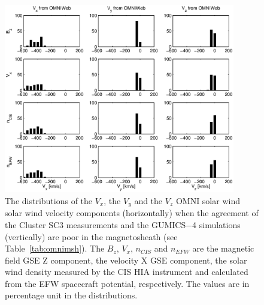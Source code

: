 \documentclass[linenumbers,draft]{agujournal}
\begin{document}
\begin{figure}[h]
\centering
\includegraphics[width=0.9\textwidth,angle=0]{swe-2020-corr-f18.eps}  
\caption{The distributions of the $V_{x}$, the $V_{y}$ and the $V_{z}$ OMNI solar wind solar wind velocity components (horizontally) when the agreement of the Cluster SC3 measurements and the GUMICS$-$4 simulations (vertically) are poor in the magnetosheath (see Table~\ref{tab:omnimsh}). The $B_{z}$, $V_{x}$, $n_{CIS}$ and $n_{EFW}$ are the magnetic field GSE Z component, the velocity X GSE component, the solar wind density measured by the CIS HIA instrument and calculated from the EFW spacecraft potential, respectively. The values are in percentage unit in the distributions.}
\label{fig:mshomnivxyz}
\end{figure}

\pagebreak
\end{document}
